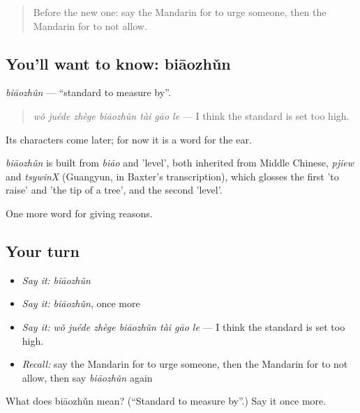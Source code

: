 \begin{quote}
Before the new one: say the Mandarin for to urge someone, then the Mandarin for to not allow.
\end{quote}

\subsection*{You'll want to know: biāozhǔn}
\emph{biāozhǔn} — \textquotedblleft{}standard to measure by\textquotedblright{}.

\begin{quote}
\emph{wǒ juéde zhège biāozhǔn tài gāo le} — I think the standard is set too high.
\end{quote}

Its characters come later; for now it is a word for the ear.

\begin{cousinweb}
\emph{biāozhǔn} is built from \emph{biāo} and  'level', both inherited from Middle Chinese, \emph{pjiew} and \emph{tsywinX} (Guangyun, in Baxter's transcription), which glosses the first 'to raise' and 'the tip of a tree', and the second 'level'.
\end{cousinweb}

\begin{grammarlens}[title={What you've built}]
One more word for giving reasons.
\end{grammarlens}

\subsection*{Your turn}
\begin{itemize}
\raggedright
  \item \emph{Say it:} \emph{biāozhǔn}
  \item \emph{Say it:} \emph{biāozhǔn}, once more
  \item \emph{Say it:} \emph{wǒ juéde zhège biāozhǔn tài gāo le} — I think the standard is set too high.
  \item \emph{Recall:} say the Mandarin for to urge someone, then the Mandarin for to not allow, then say \emph{biāozhǔn} again
\end{itemize}

\begin{tcolorbox}[breakable,colback=teal!4,colframe=teal!35!black,title={Before you move on}]
What does biāozhǔn mean? (\textquotedblleft{}Standard to measure by\textquotedblright{}.) Say it once more.
\end{tcolorbox}

